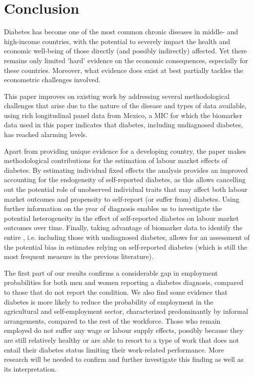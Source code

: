 \section{\label{sec:cha_4_conclusion}Conclusion}

Diabetes has become one of the most common chronic diseases in middle- and high-income countries, with the potential to severely impact the health and economic well-being of those directly (and possibly indirectly) affected. Yet there remains only limited 'hard' evidence on the economic consequences, especially for these countries. Moreover, what evidence does exist at best partially tackles the econometric challenges involved. 

This paper improves on existing work by addressing several methodological challenges that arise due to the nature of the disease and types of data available, using rich longitudinal panel data from Mexico, a \ac{MIC} for which the biomarker data used in this paper indicates that diabetes, including undiagnosed diabetes, has reached alarming levels.

Apart from providing unique evidence for a developing country, the paper makes methodological contributions for the estimation of labour market effects of diabetes. By estimating individual fixed effects the analysis provides an improved accounting for the endogeneity of self-reported diabetes, as this allows cancelling out the potential role of unobserved individual traits that may affect both labour market outcomes and propensity to self-report (or suffer from) diabetes. Using further information on the year of diagnosis enables us to investigate the potential heterogeneity in the effect of self-reported diabetes on labour market outcomes over time. Finally, taking advantage of biomarker data to identify the entire \DIFdelbegin {}\DIFdelend \DIFaddbegin {}\DIFaddend , i.e. including those with undiagnosed diabetes, allows for an assessment of the potential bias in estimates relying on self-reported diabetes (which is still the most frequent measure in the previous literature).

The first part of our results confirms a considerable gap in employment probabilities for both men and women reporting a diabetes diagnosis, compared to those that do not report the condition. We also find some evidence that diabetes is more likely to reduce the probability of employment in the agricultural and self-employment sector, characterized predominantly by informal arrangements, compared to the rest of the workforce. Those who remain employed do not suffer any wage or labour supply effects, possibly because they are still relatively healthy or are able to resort to a type of work that does not entail their diabetes status limiting their work-related performance. More research will be needed to confirm and further investigate this finding as well as its interpretation. 

